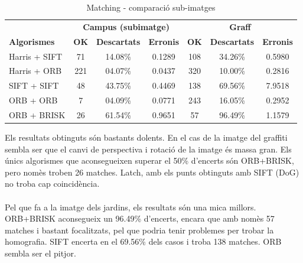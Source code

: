 		\begin{table}[H]
			\begin{center}
				\begin{tabular}{l | c c c | c c c}
					& \multicolumn{3}{c|}{\textbf{Campus (subimatge)}} & \multicolumn{3}{c}{\textbf{Graff}} \\
					\textbf{Algorismes} & \textbf{OK} & \textbf{Descartats} & \textbf{Erronis} & \textbf{OK} & \textbf{Descartats} & \textbf{Erronis} \\ \hline
					Harris + SIFT & 71 & 14.08\% & 0.1289 & 108 & 34.26\% & 0.5980 \\
					Harris + ORB & 221 & 04.07\% & 0.0437 & 320 & 10.00\% & 0.2816 \\
					SIFT + SIFT & 48 & 43.75\% & 0.4469 & 138 & 69.56\% & 7.9518 \\
					ORB + ORB & 7 & 04.09\% & 0.0771 & 243 & 16.05\% & 0.2952 \\
					ORB + BRISK & 26 & 61.54\% & 0.9651 & 57 & 96.49\% & 1.1579 \\
				\end{tabular}
			\end{center}
			\caption{Matching - comparació sub-imatges}
		\end{table}
		\noindent
		Els resultats obtinguts són bastants dolents. En el cas de la imatge del graffiti sembla ser que el canvi de perspectiva i rotació de la imatge és massa gran.
		Els únics algorismes que aconsegueixen superar el 50\% d'encerts són ORB+BRISK, pero nomès troben 26 matches. Latch, amb els punts obtinguts amb SIFT (DoG) no troba cap coincidència.\\\\
		Pel que fa a la imatge dels jardins, els resultats són una mica millors. ORB+BRISK aconsegueix un 96.49\% d'encerts, encara que amb nomès 57 matches i bastant focalitzats, pel que podria tenir
		problemes per trobar la homografia. SIFT encerta en el 69.56\% dels casos i troba 138 matches. ORB sembla ser el pitjor.\\

